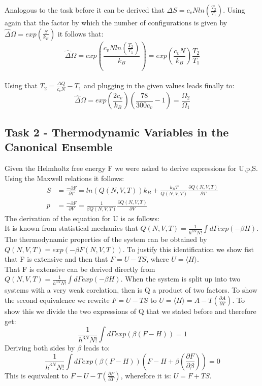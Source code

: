 \documentclass[12pt,a4paper]{scrartcl}
\begin{document}
 Analogous to the task before it can be derived that $\Delta S = c_vNln\left(\frac{T_2}{T_1}\right)$.
 Using again that the factor by which the number of configurations is given by $\hat \Delta \Omega = exp(\frac{S}{k_B})$ it follows that:\\
 \[\hat \Delta \Omega = exp\left(\frac{c_vNln(\frac{T_2}{T_1})}{k_B}\right)=exp\left(\frac{c_vN}{k_B}\right)\frac{T_2}{T_1} \]\\
Using that $T_2=\frac{\Delta Q}{c_vN}-T_1$ and plugging in the given values leads finally to:\\
\[\hat \Delta \Omega = exp\left(\frac{2c_v}{k_B}\right)\left(\frac{78}{300c_v }-1\right)= \frac{\Omega_2}{\Omega_1}\]

\newpage
\subsection{Task 2 - Thermodynamic Variables in the Canonical Ensemble}
Given the Helmholtz free energy F we were asked to derive expressions for U,p,S.
Using the Maxwell relations it follows:\\
\begin{align}
S&=\frac{-\partial F}{\partial T} = ln(Q(N,V,T))k_B+\frac{k_BT}{Q(N,V,T)}\frac{\partial Q(N,V,T)}{\partial T}\nonumber\\
p&=\frac{-\partial F}{\partial V}=\frac{1}{\beta Q(N,V,T)}\frac{\partial Q(N,V,T)}{\partial V}\nonumber
\end{align}
The derivation of the equation for U is as follows:\\
It is known from statistical mechanics that $Q(N,V,T)= \frac{1}{h^{3N}N!}\int d\Gamma exp(-\beta H)$. The thermodynamic properties of the system can be obtained by $Q(N,V,T)=exp(-\beta F(N,V,T))$. To justify this identification we show fist that F is extensive and then that $F=U-TS$, where $U=\langle H \rangle$.\\
That F is extensive can be derived directly from $Q(N,V,T)= \frac{1}{h^{3N}N!}\int d\Gamma exp(-\beta H)$. When the system is split up into two systems with a very weak corelation, then is Q a product of two factors.
To show the second equivalence we rewrite $F = U -TS $ to $U = \langle H \rangle = A - T\left(\frac{\partial A}{\partial T} \right)$.
To show this we divide the two expressions of Q that we stated before and therefore get:\\
\[\frac{1}{h^{3N}N!}\int d\Gamma exp(\beta (F-H))=1\]
Deriving both sides by $\beta$ leads to:\\
\[ \frac{1}{h^{3N}N!}\int d\Gamma exp(\beta (F-H))(F-H+\beta \left(\frac{\partial F}{\partial \beta}\right))=0\]
This is equivalent to $F - U - T \left(\frac{\partial F}{\partial T}\right)$, wherefore it is: $U= F+TS$.
\end{document}
